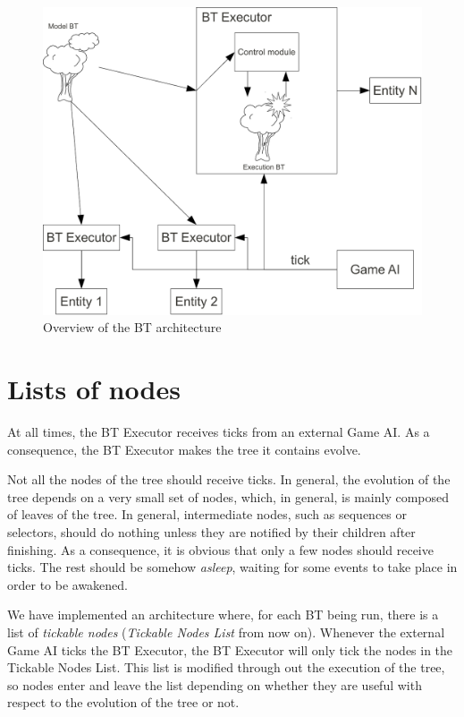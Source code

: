 \documentclass[a4paper,10pt]{article}
\begin{document}
\begin{figure}
 \centering
 \includegraphics[width=\textwidth]{./Images/Overview.pdf}
 \caption{Overview of the BT architecture}
 \label{fig:Overview}
\end{figure}

\section{Lists of nodes}

At all times, the BT Executor receives ticks from an external Game AI. As a consequence, the BT Executor makes the tree it contains evolve.

Not all the nodes of the tree should receive ticks. In general, the evolution of the tree depends on a very small set of nodes, which, in general, is mainly composed of leaves of the tree. In general, intermediate nodes, such as sequences or selectors, should do nothing unless they are notified by their children after finishing. As a consequence, it is obvious that only a few nodes should receive ticks. The rest should be somehow \textit{asleep}, waiting for some events to take place in order to be awakened.

We have implemented an architecture where, for each BT being run, there is a list of \textit{tickable nodes} (\textit{Tickable Nodes List} from now on). Whenever the external Game AI ticks the BT Executor, the BT Executor will only tick the nodes in the Tickable Nodes List. This list is modified through out the execution of the tree, so nodes enter and leave the list depending on whether they are useful with respect to the evolution of the tree or not.
\end{document}
